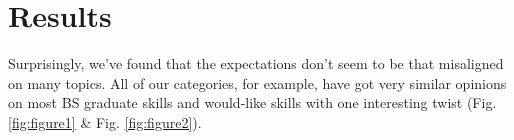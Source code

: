 \documentclass{sigchi}
\begin{document}
%

\section{Results}
Surprisingly, we've found that the expectations don't seem to be that misaligned on many topics. All of our categories, for example, have got very similar opinions on most BS graduate skills and would-like skills with one interesting twist (Fig. \ref{fig:figure1} \& Fig. \ref{fig:figure2}).
\end{document}
